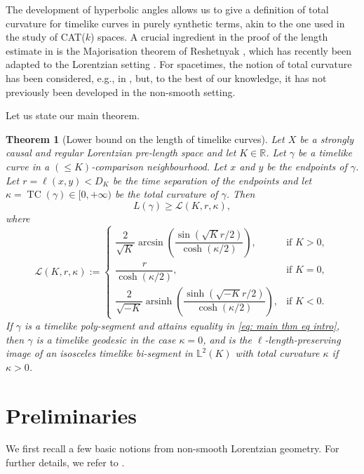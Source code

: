 \documentclass[hidelinks,12pt,a4paper]{article}
\numberwithin{equation}{section}
\theoremstyle{plain}
\newtheorem{theorem}[definition]{Theorem}
\theoremstyle{definition}
\DeclareMathOperator{\TC}{TC}
\newcommand{\lm}[1]{\mathbb{L}^2(#1)}
\newcommand{\LpLS}{Lo\-rentz\-ian pre-length space }
\begin{document}
The development of hyperbolic angles \cite{BS23} allows us to give a definition of total curvature for timelike curves in purely synthetic terms, akin to the one used in the study of CAT($k$) spaces.
A crucial ingredient in the proof of the length estimate in \cite{ML2003} is the Majorisation theorem of Reshetnyak \cite{Res68}, which has recently been adapted to the Lorentzian setting \cite{BR25+}. 
For spacetimes, the notion of total curvature has been considered, e.g., in \cite{FGL01, BCO06, CFO07}, but, to the best of our knowledge, it has not previously been developed in the non-smooth setting. 

Let us state our main theorem.
\begin{theorem}[Lower bound on the length of timelike curves]
Let $X$ be a strongly causal and regular \LpLS and let $K \in \mathbb{R}$. 
Let $\gamma$ be a timelike curve in a $(\leq K)$-comparison neighbourhood. 
Let $x$ and $y$ be the endpoints of $\gamma$. 
Let $r=\ell(x,y)<D_K$ be the time separation of the endpoints and let $\kappa=\TC(\gamma)\in[0,+\infty)$ be the total curvature of $\gamma$. 
Then
\begin{equation}
\label{eq: main thm eq intro}
L(\gamma)\ge \mathcal{L}(K,r,\kappa),
\end{equation}
where
\begin{equation*}
\mathcal{L}(K,r,\kappa):=
\begin{cases}
\dfrac{2}{\sqrt{K}}\arcsin\!\left(\dfrac{\sin(\sqrt{K}r/2)}{\cosh(\kappa/2)}\right), & \mathrm{if}\,\,K>0,\\[1.2ex]
\dfrac{r}{\cosh(\kappa/2)}, & \mathrm{if}\,\,K=0,\\[1.2ex]
\dfrac{2}{\sqrt{-K}}\operatorname{arsinh}\!\left(\dfrac{\sinh(\sqrt{-K}r/2)}{\cosh(\kappa/2)}\right), & \mathrm{if}\,\,K<0.
\end{cases}
\end{equation*} 
If $\gamma$ is a timelike poly-segment and attains equality in \eqref{eq: main thm eq intro}, then $\gamma$ is a timelike geodesic in the case $\kappa=0$, and is the $\ell$-length-preserving image of an isosceles timelike bi-segment in $\lm K$ with total curvature $\kappa$ if $\kappa>0$.
\end{theorem}

\section{Preliminaries}\label{subsection 2.1}
We first recall a few basic notions from non-smooth Lorentzian geometry. For further details, we refer to \cite{KS18, BS23, BKR24}.
\end{document}

